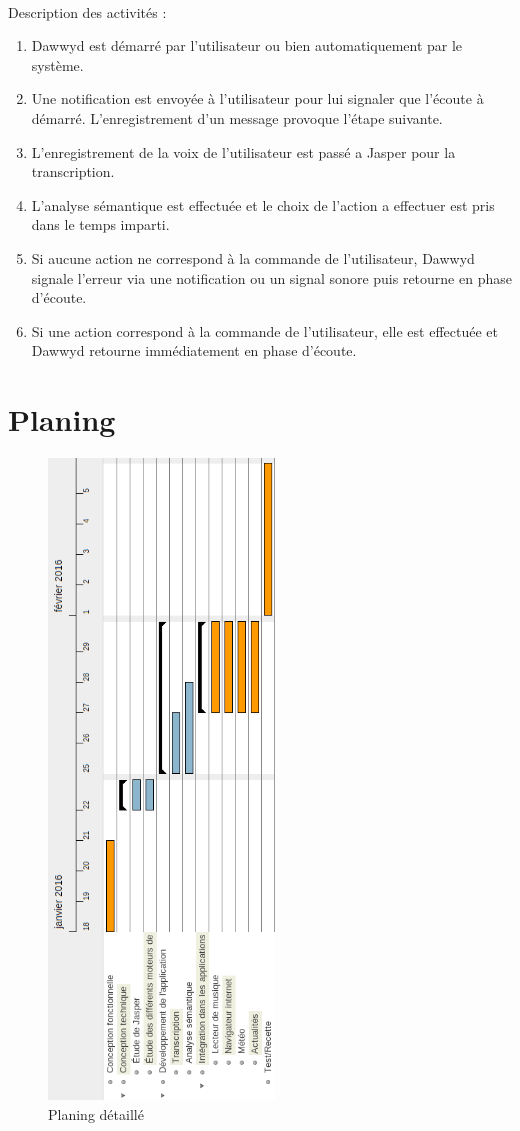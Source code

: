 \documentclass[12pt]{article}
\begin{document}
    \paragraph{}
    Description des activités :
    \begin{enumerate}
        \item Dawwyd est démarré par l'utilisateur ou bien automatiquement par
            le système.
        \item Une notification est envoyée à l'utilisateur pour lui signaler
            que l'écoute à démarré. L'enregistrement d'un message provoque
            l'étape suivante.
        \item L'enregistrement de la voix de l'utilisateur est passé a Jasper
            pour la transcription.
        \item L'analyse sémantique est effectuée et le choix de l'action a effectuer
            est pris dans le temps imparti.
        \item Si aucune action ne correspond à la commande de l'utilisateur,
            Dawwyd signale l'erreur via une notification ou un signal sonore
            puis retourne en phase d'écoute.
        \item Si une action correspond à la commande de l'utilisateur, elle est
            effectuée et Dawwyd retourne immédiatement en phase d'écoute.
    \end{enumerate}



    \section{Planing}

    \begin{figure}[H]
        \centering
        \includegraphics[width=6cm]{gantt.png}
        \caption{Planing détaillé}
    \end{figure}
\end{document}
